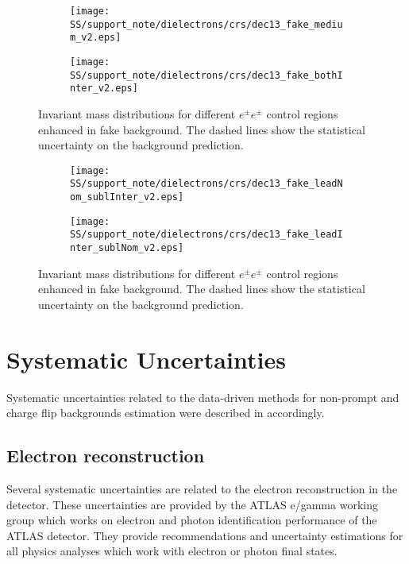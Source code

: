 \begin{figure}
\begin{subfigure}{.5\textwidth}
  \centering
  \texttt{[image: SS/support\_note/dielectrons/crs/dec13\_fake\_medium\_v2.eps]}
\end{subfigure}%
\begin{subfigure}{.5\textwidth}
  \centering
  \texttt{[image: SS/support\_note/dielectrons/crs/dec13\_fake\_bothInter\_v2.eps]}
\end{subfigure}
\caption{\toDo Invariant mass distributions for different $e^{\pm}e^{\pm}$ control regions enhanced in fake background. The dashed lines show the statistical uncertainty on the background prediction.}
  \label{fig:fakeCR_part1}
\end{figure}

\begin{figure}
\begin{subfigure}{.5\textwidth}
  \centering
  \texttt{[image: SS/support\_note/dielectrons/crs/dec13\_fake\_leadNom\_sublInter\_v2.eps]}
\end{subfigure}%
\begin{subfigure}{.5\textwidth}
  \centering
  \texttt{[image: SS/support\_note/dielectrons/crs/dec13\_fake\_leadInter\_sublNom\_v2.eps]}
\end{subfigure}
\caption{\toDo Invariant mass distributions for different $e^{\pm}e^{\pm}$ control regions enhanced in fake background. The dashed lines show the statistical uncertainty on the background prediction.}
  \label{fig:fakeCR_part2}
\end{figure}



\section{Systematic Uncertainties}
\label{sec:ss_Systematics}



Systematic uncertainties related to the data-driven methods for non-prompt and charge flip backgrounds estimation 
were described in  \toDo[] accordingly.

\subsection{Electron reconstruction}
Several systematic uncertainties are related to the electron reconstruction in the detector.
These uncertainties are provided by the ATLAS e/gamma working group which works on electron and photon identification performance of the ATLAS detector.
They provide recommendations and uncertainty estimations for all physics analyses which work with electron or photon final states.

